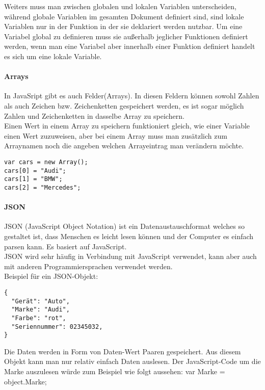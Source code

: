 Weiters muss man zwischen globalen und lokalen Variablen unterscheiden, während globale Variablen im gesamten Dokument definiert sind, sind lokale Variablen nur in der Funktion in der sie deklariert werden nutzbar. Um eine Variabel global zu definieren muss sie außerhalb jeglicher Funktionen definiert werden, wenn man eine Variabel aber innerhalb einer Funktion definiert handelt es sich um eine lokale Variable.\\

\paragraph*{Arrays}
In JavaSript gibt es auch Felder(Arrays). In diesen Feldern können sowohl Zahlen als auch Zeichen bzw. Zeichenketten gespeichert werden, es ist sogar möglich Zahlen und Zeichenketten in dasselbe Array zu speichern.\\
Einen Wert in einem Array zu speichern funktioniert gleich, wie einer Variable einen Wert zuzuweisen, aber bei einem Array muss man zusätzlich zum Arraynamen noch die angeben welchen Arrayeintrag man verändern möchte.\\
\begin{lstlisting}
var cars = new Array();
cars[0] = "Audi";
cars[1] = "BMW";
cars[2] = "Mercedes";
\end{lstlisting}

\paragraph*{JSON}
JSON (JavaScript Object Notation) ist ein Datenaustauschformat welches so gestaltet ist, dass Menschen es leicht lesen können und der Computer es einfach parsen kann. Es basiert auf JavaScript.\\
JSON wird sehr häufig in Verbindung mit JavaScript verwendet, kann aber auch mit anderen Programmiersprachen verwendet werden.\\
Beispiel für ein JSON-Objekt:\\
\begin{lstlisting}
{
  "Gerät": "Auto",
  "Marke": "Audi",
  "Farbe": "rot",
  "Seriennummer": 02345032,
}
\end{lstlisting}

Die Daten werden in Form von Daten-Wert Paaren gespeichert. Aus diesem Objekt kann man nur relativ einfach Daten auslesen. Der JavaScript-Code um die Marke auszulesen würde zum Beispiel wie folgt aussehen:
var Marke = object.Marke;

